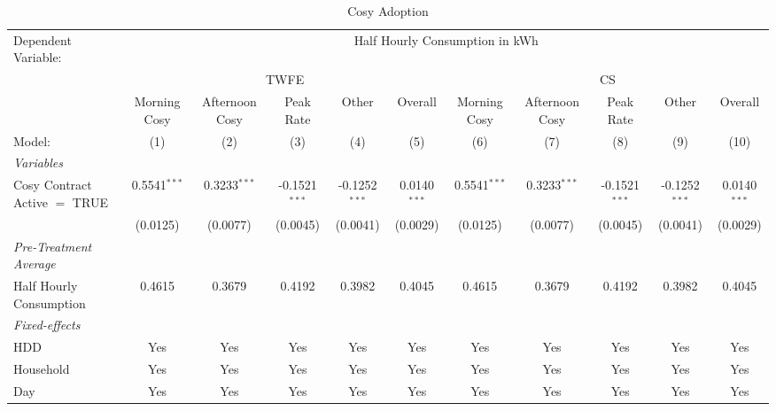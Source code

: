 
\begin{table}[htbp]
   \caption{\label{tab:did-main} Cosy Adoption}
   \centering
   \begin{tabular}{lcccccccccc}
      \tabularnewline \midrule \midrule
      Dependent Variable: & \multicolumn{10}{c}{Half Hourly Consumption in kWh}\\
       & \multicolumn{5}{c}{TWFE} & \multicolumn{5}{c}{CS} \\ 
                                     & Morning Cosy   & Afternoon Cosy & Peak Rate       & Other           & Overall        & Morning Cosy   & Afternoon Cosy & Peak Rate       & Other           & Overall \\   
      Model:                         & (1)            & (2)            & (3)             & (4)             & (5)            & (6)            & (7)            & (8)             & (9)             & (10)\\  
      \midrule
      \emph{Variables}\\
      Cosy Contract Active $=$ TRUE  & 0.5541$^{***}$ & 0.3233$^{***}$ & -0.1521$^{***}$ & -0.1252$^{***}$ & 0.0140$^{***}$ & 0.5541$^{***}$ & 0.3233$^{***}$ & -0.1521$^{***}$ & -0.1252$^{***}$ & 0.0140$^{***}$\\   
                                     & (0.0125)       & (0.0077)       & (0.0045)        & (0.0041)        & (0.0029)       & (0.0125)       & (0.0077)       & (0.0045)        & (0.0041)        & (0.0029)\\   
\midrule
\emph{Pre-Treatment Average}\\
      Half Hourly Consumption        & 0.4615         & 0.3679         & 0.4192          & 0.3982          & 0.4045         & 0.4615         & 0.3679         & 0.4192          & 0.3982          & 0.4045\\  
      \midrule
      \emph{Fixed-effects}\\
      HDD                            & Yes            & Yes            & Yes             & Yes             & Yes            & Yes            & Yes            & Yes             & Yes             & Yes\\  
      Household                      & Yes            & Yes            & Yes             & Yes             & Yes            & Yes            & Yes            & Yes             & Yes             & Yes\\  
      Day                            & Yes            & Yes            & Yes             & Yes             & Yes            & Yes            & Yes            & Yes             & Yes             & Yes\\  

\end{tabular}
\end{table}
